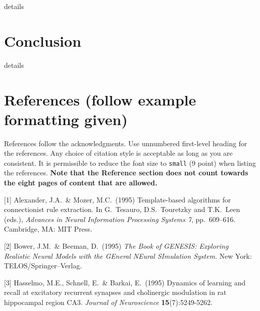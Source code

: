 \documentclass{article}
\begin{document}
details

\section{Conclusion}

details


\section*{References (follow example formatting given)}

References follow the acknowledgments. Use unnumbered first-level heading for
the references. Any choice of citation style is acceptable as long as you are
consistent. It is permissible to reduce the font size to \verb+small+ (9 point)
when listing the references.
{\bf Note that the Reference section does not count towards the eight pages of content that are allowed.}
\medskip

\small

[1] Alexander, J.A.\ \& Mozer, M.C.\ (1995) Template-based algorithms for
connectionist rule extraction. In G.\ Tesauro, D.S.\ Touretzky and T.K.\ Leen
(eds.), {\it Advances in Neural Information Processing Systems 7},
pp.\ 609--616. Cambridge, MA: MIT Press.

[2] Bower, J.M.\ \& Beeman, D.\ (1995) {\it The Book of GENESIS: Exploring
  Realistic Neural Models with the GEneral NEural SImulation System.}  New York:
TELOS/Springer--Verlag.

[3] Hasselmo, M.E., Schnell, E.\ \& Barkai, E.\ (1995) Dynamics of learning and
recall at excitatory recurrent synapses and cholinergic modulation in rat
hippocampal region CA3. {\it Journal of Neuroscience} {\bf 15}(7):5249-5262.
\end{document}

